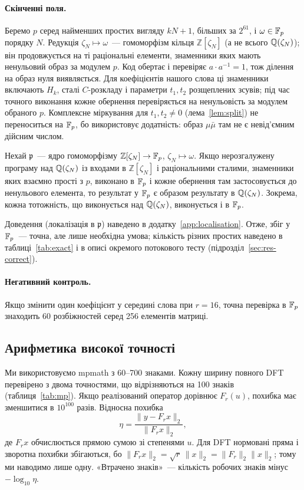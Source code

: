 \documentclass[11pt]{article}
\theoremstyle{plain}
\newcommand{\norm}[1]{\lVert #1\rVert}
\newcommand{\Z}{\mathbb{Z}}
\begin{document}
\paragraph{Скінченні поля.}
Беремо $p$ серед найменших простих вигляду $kN+1$, більших за $2^{61}$, і $\omega\in\mathbb{F}_p$ порядку $N$. Редукція $\zeta_N\mapsto\omega$~--- гомоморфізм кільця $\Z[\zeta_N]$ (а не всього $\mathbb{Q}(\zeta_N)$); він продовжується на ті раціональні елементи, знаменники яких мають ненульовий образ за модулем $p$. Код обертає і перевіряє $a\cdot a^{-1}=1$, тож ділення на образ нуля виявляється. Для коефіцієнтів нашого слова ці знаменники включають $H_k$, сталі $C$-розкладу і параметри $t_1,t_2$ розщеплених зсувів; під час точного виконання кожне обернення перевіряється на ненульовість за модулем обраного $p$. Комплексне міркування для $t_1,t_2\ne0$ (лема~\ref{lem:split}) не переноситься на $\mathbb{F}_p$, бо використовує додатність: образ $\mu\bar\mu$ там не є невід'ємним дійсним числом.
\begin{proposition}\label{prop:localisation}
Нехай $\mathfrak p$~--- ядро гомоморфізму $\Z[\zeta_N]\to\Fp$, $\zeta_N\mapsto\omega$. Якщо нерозгалужену програму над $\mathbb{Q}(\zeta_N)$ із входами в $\Z[\zeta_N]$ і раціональними сталими, знаменники яких взаємно прості з $p$, виконано в $\mathbb{F}_p$ і кожне обернення там застосовується до ненульового елемента, то результат у $\mathbb{F}_p$ є образом результату в $\mathbb{Q}(\zeta_N)$. Зокрема, кожна тотожність, що виконується над $\mathbb{Q}(\zeta_N)$, виконується і в $\mathbb{F}_p$.
\end{proposition}
Доведення (локалізація в $\mathfrak p$) наведено в додатку~\ref{app:localisation}. Отже, збіг у $\mathbb{F}_p$~--- точна, але лише необхідна умова; кількість різних простих наведено в таблиці~\ref{tab:exact} і в описі окремого потокового тесту (підрозділ~\ref{sec:res-correct}).

\paragraph{Негативний контроль.}
Якщо змінити один коефіцієнт у середині слова при $r=16$, точна перевірка в $\mathbb{F}_p$ знаходить 60 розбіжностей серед 256 елементів матриці.

\subsection{Арифметика високої точності}\label{sec:mp}
Ми використовуємо mpmath з 60--700 знаками. Кожну ширину повного DFT перевірено з двома точностями, що відрізняються на 100 знаків (таблиця~\ref{tab:mp}). Якщо реалізований оператор дорівнює $F_r(u)$, похибка має зменшитися в $10^{100}$ разів. Відносна похибка
\begin{equation}\label{eq:relerr}
\eta=\frac{\norm{y-F_r x}_2}{\norm{F_r x}_2},
\end{equation}
де $F_r x$ обчислюється прямою сумою зі степенями $u$. Для DFT нормовані пряма і зворотна похибки збігаються, бо $\norm{F_r x}_2=\sqrt r\,\norm{x}_2=\norm{F_r}_2\norm{x}_2$; тому ми наводимо лише одну. «Втрачено знаків»~--- кількість робочих знаків мінус $-\log_{10}\eta$.
\end{document}
